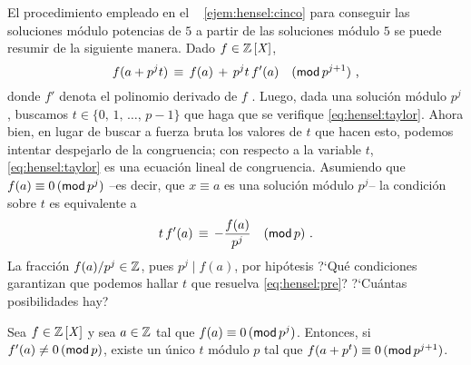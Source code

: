 \begin{obsHensel}\label{obs:hensel:taylor}
	El procedimiento empleado en el \ejemname~%
	\ref{ejem:hensel:cinco} para conseguir las soluciones
	m\'odulo potencias de $5$ a partir de las soluciones
	m\'odulo $5$ se puede resumir de la siguiente manera.
	Dado $f\in\polinomios\Enteros$,
	\begin{equation}
		\label{eq:hensel:taylor}
		f(a+p^jt)\,\equiv\,f(a)\,+\,p^jt\,f'(a)
			\modulo[p^{j+1}]
		\dispcomma
	\end{equation}
	donde $f'$ denota el polinomio derivado de $f$
	\quedacomoejercicio.%
	Luego, dada una soluci\'on m\'odulo $p^j$, buscamos
	$t\in\{0,\,1,\,\dots,\,p-1\}$ que haga que se verifique
	\eqref{eq:hensel:taylor}.
	Ahora bien, en lugar de buscar a fuerza bruta los valores
	de $t$ que hacen esto, podemos intentar despejarlo de la
	congruencia; con respecto a la variable $t$,
	\eqref{eq:hensel:taylor} es una ecuaci\'on lineal de
	congruencia. Asumiendo que $f(a)\equiv 0\tmodulo[p^j]$
	--es decir, que $x\equiv a$ es una soluci\'on m\'odulo $p^j$--
	la condici\'on sobre $t$ es equivalente a
	\begin{equation}
		\label{eq:hensel:pre}
		t\,f'(a)\,\equiv\,-\frac{f(a)}{p^j}\modulo[p]
		\dispstop
	\end{equation}
	La fracci\'on $f(a)/p^j\in\Enteros$, pues $p^j\mid f(a)$,
	por hip\'otesis ?`Qu\'e condiciones garantizan que
	podemos hallar $t$ que resuelva \eqref{eq:hensel:pre}?
	?`Cu\'antas posibilidades hay?
\end{obsHensel}

\begin{teoHensel}
	Sea $f\in\polinomios\Enteros$ y sea $a\in\Enteros$ tal
	que $f(a)\equiv 0\tmodulo[p^j]$.
	Entonces, si $f'(a)\neq 0\tmodulo[p]$, existe un \'unico
	$t$ m\'odulo $p$ tal que
	$f(a+p^t)\equiv 0\tmodulo[p^{j+1}]$.
\end{teoHensel}

